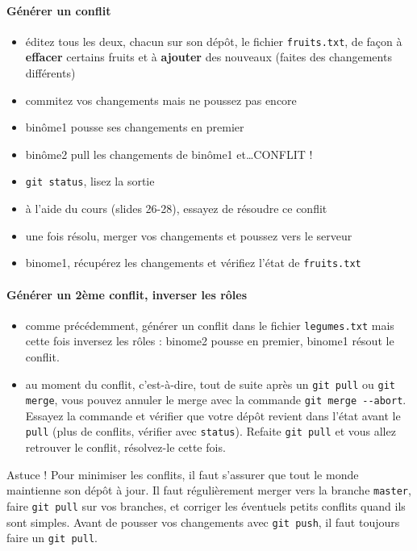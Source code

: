 \documentclass[final, a4paper, openbib, ]{article}
\begin{document}
\paragraph{Générer un conflit}
\begin{itemize}
\item éditez tous les deux, chacun sur son dépôt, le fichier \texttt{fruits.txt}, de façon à \textbf{effacer} certains fruits et à \textbf{ajouter} des nouveaux (faites des changements différents)
\item commitez vos changements mais ne poussez pas encore
\item binôme1 pousse ses changements en premier
\item binôme2 pull les changements de binôme1 et\ldots CONFLIT !
\item \texttt{git status}, lisez la sortie
\item à l'aide du cours (slides 26-28), essayez de résoudre ce conflit
\item une fois résolu, merger vos changements et poussez vers le serveur
\item binome1, récupérez les changements et vérifiez l'état de \texttt{fruits.txt}
\end{itemize}

\paragraph{Générer un 2ème conflit, inverser les rôles}
\begin{itemize}
\item comme précédemment, générer un conflit dans le fichier \texttt{legumes.txt} mais cette fois inversez les rôles :  binome2 pousse en premier, binome1 résout le conflit.
\item au moment du conflit, c'est-à-dire, tout de suite après un \texttt{git pull} ou \texttt{git merge}, vous pouvez annuler le merge avec la commande \texttt{git merge -{}-abort}.
Essayez la commande et vérifier que votre dépôt revient dans l'état avant le \texttt{pull} (plus de conflits, vérifier avec \texttt{status}).
Refaite \texttt{git pull} et vous allez retrouver le conflit, résolvez-le cette fois.
\end{itemize}

\begin{alertinfo3}{Astuce !}
Pour minimiser les conflits, il faut s'assurer que tout le monde maintienne son dépôt à jour.
Il faut régulièrement merger vers la branche \texttt{master}, faire \texttt{git pull} sur vos branches, et corriger les éventuels petits conflits quand ils sont simples.
Avant de pousser vos changements avec \texttt{git push}, il faut toujours faire un \texttt{git pull}.
\end{alertinfo3}
\end{document}
